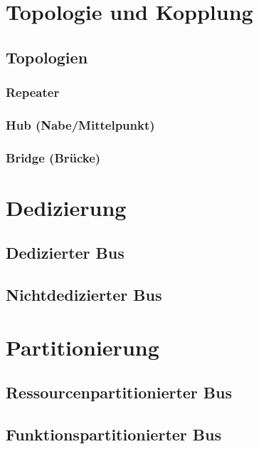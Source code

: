 
\section{Topologie und Kopplung}
\subsection{Topologien}
\subsubsection{Repeater}
\subsubsection{Hub (Nabe/Mittelpunkt)}
\subsubsection{Bridge (Brücke)}

\section{Dedizierung}
\subsection{Dedizierter Bus}
\subsection{Nichtdedizierter Bus}

\section{Partitionierung}
\subsection{Ressourcenpartitionierter Bus}
\subsection{Funktionspartitionierter Bus}

